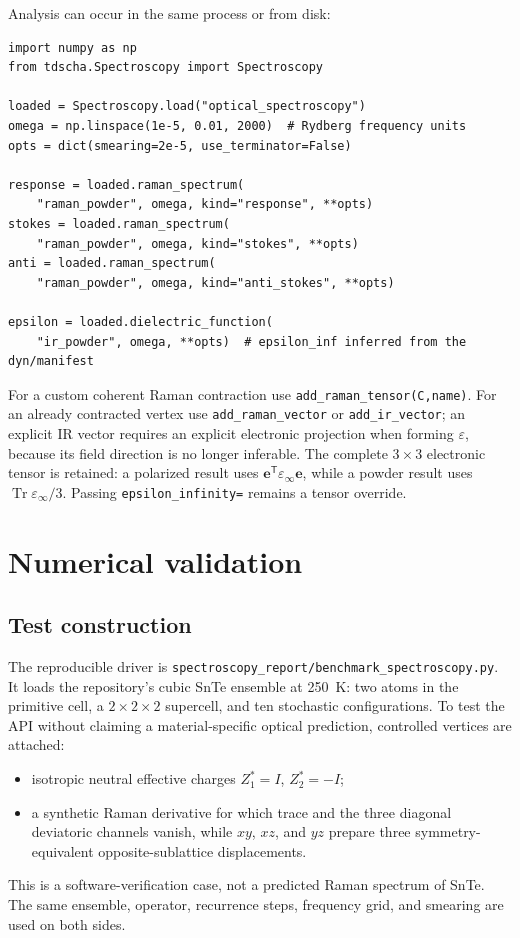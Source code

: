\documentclass[11pt,a4paper]{article}
\begin{document}
Analysis can occur in the same process or from disk:
\begin{lstlisting}
import numpy as np
from tdscha.Spectroscopy import Spectroscopy

loaded = Spectroscopy.load("optical_spectroscopy")
omega = np.linspace(1e-5, 0.01, 2000)  # Rydberg frequency units
opts = dict(smearing=2e-5, use_terminator=False)

response = loaded.raman_spectrum(
    "raman_powder", omega, kind="response", **opts)
stokes = loaded.raman_spectrum(
    "raman_powder", omega, kind="stokes", **opts)
anti = loaded.raman_spectrum(
    "raman_powder", omega, kind="anti_stokes", **opts)

epsilon = loaded.dielectric_function(
    "ir_powder", omega, **opts)  # epsilon_inf inferred from the dyn/manifest
\end{lstlisting}

For a custom coherent Raman contraction use
\texttt{add\_raman\_tensor(C,name)}.  For an already contracted vertex use
\texttt{add\_raman\_vector} or \texttt{add\_ir\_vector}; an explicit IR
vector requires an explicit electronic projection when forming
$\varepsilon$, because its field direction is no longer inferable.
The complete $3\times3$ electronic tensor is retained: a polarized result
uses $\bm e^{\mathsf T}\varepsilon_\infty\bm e$, while a powder result uses
$\operatorname{Tr}\varepsilon_\infty/3$.  Passing
\texttt{epsilon\_infinity=} remains a tensor override.

\section{Numerical validation}
\label{sec:validation}

\subsection{Test construction}

The reproducible driver is
\texttt{spectroscopy\_report/benchmark\_spectroscopy.py}.  It loads the
repository's cubic SnTe ensemble at 250~K: two atoms in the primitive cell, a
$2\times2\times2$ supercell, and ten stochastic configurations.  To test the
API without claiming a material-specific optical prediction, controlled
vertices are attached:
\begin{itemize}
  \item isotropic neutral effective charges $Z_1^*=I$, $Z_2^*=-I$;
  \item a synthetic Raman derivative for which trace and the three diagonal
        deviatoric channels vanish, while $xy$, $xz$, and $yz$ prepare three
        symmetry-equivalent opposite-sublattice displacements.
\end{itemize}
This is a software-verification case, not a predicted Raman spectrum of SnTe.
The same ensemble, operator, \BenchSteps{} recurrence steps, frequency grid,
and smearing are used on both sides.
\end{document}
